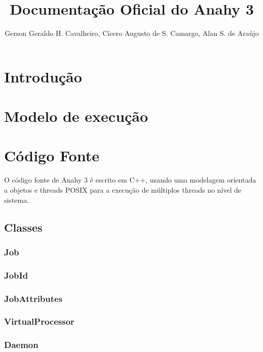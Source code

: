 \documentclass[12pt]{article}
\title{Documentação Oficial do Anahy 3}
\author{Gerson Geraldo H. Cavalheiro, Cícero Augusto de S. Camargo, Alan S. de Araújo}
\begin{document}
\maketitle

\section{Introdução} %
\label{sec:introducao}


\section{Modelo de execução} %
\label{sec:modelo_de_execucao}


\section{Código Fonte} %
\label{sec:codigo}

O código fonte de Anahy 3 é escrito em C++, usando uma modelagem orientada a objetos e threads POSIX para a execução de múltiplos threads no nível de sistema.

\subsection{Classes} %
\label{sub:classes}


\subsubsection*{Job}

\subsubsection*{JobId}


\subsubsection*{JobAttributes}


\subsubsection*{VirtualProcessor}


\subsubsection*{Daemon}
\end{document}
